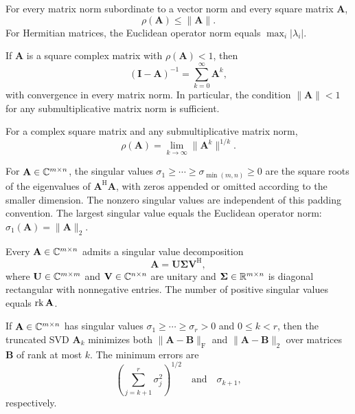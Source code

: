 \begin{theorem}
For every matrix norm subordinate to a vector norm and every square matrix $\mathbf{A}$,
\[
 \rho(\mathbf{A})\le\|\mathbf{A}\|.
\]
For Hermitian matrices, the Euclidean operator norm equals $\max_i|\lambda_i|$.
\end{theorem}

\begin{theorem}
If $\mathbf{A}$ is a square complex matrix with $\rho(\mathbf{A})<1$, then
\[
 (\mathbf{I}-\mathbf{A})^{-1}=\sum_{k=0}^\infty\mathbf{A}^k,
\]
with convergence in every matrix norm. In particular, the condition $\|\mathbf{A}\|<1$ for any submultiplicative matrix norm is sufficient.
\end{theorem}

\begin{theorem}
For a complex square matrix and any submultiplicative matrix norm,
\[
 \rho(\mathbf{A})=\lim_{k\to\infty}\|\mathbf{A}^k\|^{1/k}.
\]
\end{theorem}

\begin{definition}
For $\mathbf{A}\in\mathbb{C}^{m\times n}$, the singular values $\sigma_1\ge\cdots\ge\sigma_{\min(m,n)}\ge0$ are the square roots of the eigenvalues of $\mathbf{A}^{\mathrm{H}}\mathbf{A}$, with zeros appended or omitted according to the smaller dimension. The nonzero singular values are independent of this padding convention. The largest singular value equals the Euclidean operator norm: $\sigma_1(\mathbf{A})=\|\mathbf{A}\|_2$.
\end{definition}

\begin{theorem}
Every $\mathbf{A}\in\mathbb{C}^{m\times n}$ admits a singular value decomposition
\[
 \mathbf{A}=\mathbf{U}\boldsymbol\Sigma\mathbf{V}^{\mathrm{H}},
\]
where $\mathbf{U}\in\mathbb{C}^{m\times m}$ and $\mathbf{V}\in\mathbb{C}^{n\times n}$ are unitary and $\boldsymbol\Sigma\in\mathbb{R}^{m\times n}$ is diagonal rectangular with nonnegative entries. The number of positive singular values equals $\operatorname{rk}\mathbf{A}$.
\end{theorem}

\begin{theorem}
If $\mathbf{A}\in\mathbb{C}^{m\times n}$ has singular values $\sigma_1\ge\cdots\ge\sigma_r>0$ and $0\le k<r$, then the truncated SVD $\mathbf{A}_k$ minimizes both $\|\mathbf{A}-\mathbf{B}\|_{\mathrm F}$ and $\|\mathbf{A}-\mathbf{B}\|_2$ over matrices $\mathbf{B}$ of rank at most $k$. The minimum errors are
\[
 \left(\sum_{j=k+1}^r\sigma_j^2\right)^{1/2}
 \quad\text{and}\quad\sigma_{k+1},
\]
respectively.
\end{theorem}

